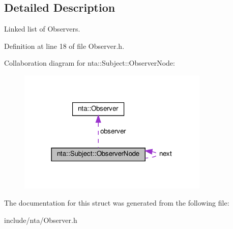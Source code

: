 \subsection{Detailed Description}
Linked list of Observers. 

Definition at line 18 of file Observer.\+h.



Collaboration diagram for nta\+:\+:Subject\+:\+:Observer\+Node\+:\nopagebreak
\begin{figure}[H]
\begin{center}
\leavevmode
\includegraphics[width=258pt]{dd/dbe/structnta_1_1Subject_1_1ObserverNode__coll__graph}
\end{center}
\end{figure}


The documentation for this struct was generated from the following file\+:\begin{DoxyCompactItemize}
\item 
include/nta/Observer.\+h\end{DoxyCompactItemize}

